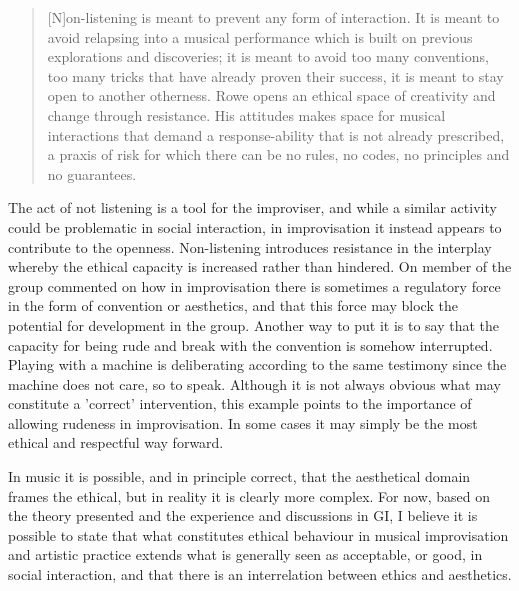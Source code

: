 \documentclass[11pt]{article}
\begin{document}
\begin{quote} [N]on-listening is meant to prevent any form of
    interaction. It is meant to avoid relapsing into a musical
    performance which is built on previous explorations and
    discoveries; it is meant to avoid too many conventions, too many
    tricks that have already proven their success, it is meant to stay
    open to another otherness. Rowe opens an ethical space of
    creativity and change through resistance. His attitudes makes
    space for musical interactions that demand a response-ability that
    is not already prescribed, a praxis of risk for which there can be
    no rules, no codes, no principles and no
    guarantees. \citep[p. 87]{cobussen2016}
\end{quote}

The act of not listening is a tool for the improviser, and while a
similar activity could be problematic in social interaction, in
improvisation it instead appears to contribute to the
openness. Non-listening introduces resistance in the interplay whereby
the ethical capacity is increased rather than hindered. On member of
the group commented on how in improvisation there is sometimes a
regulatory force in the form of convention or aesthetics, and that
this force may block the potential for development in the
group. Another way to put it is to say that the capacity for being
rude and break with the convention is somehow interrupted. Playing
with a machine is deliberating according to the same testimony since
the machine does not care, so to speak. Although it is not always
obvious what may constitute a 'correct' intervention, this example
points to the importance of allowing rudeness in improvisation. In
some cases it may simply be the most ethical and respectful way
forward.

In music it is possible, and in principle correct, that the
aesthetical domain frames the ethical, but in reality it is clearly
more complex. For now, based on the theory presented and the
experience and discussions in GI, I believe it is possible to state
that what constitutes ethical behaviour in musical improvisation and
artistic practice extends what is generally seen as acceptable, or
good, in social interaction, and that there is an interrelation
between ethics and aesthetics.
\end{document}

